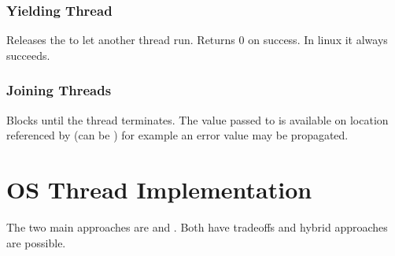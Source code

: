 \documentclass{report}
\begin{document}
        \subsubsection*{Yielding Thread}
            
            Releases the  to let another thread run. Returns $0$ on success. In linux it always succeeds.
        
        \subsubsection*{Joining Threads}
            
            Blocks until the thread terminates. The value passed to  is available on location referenced by  (can be ) for example an error value may be propagated.
            
        
    \section*{OS Thread Implementation}
        The two main  approaches are  and . Both have tradeoffs and hybrid approaches are possible.
        
\end{document}
